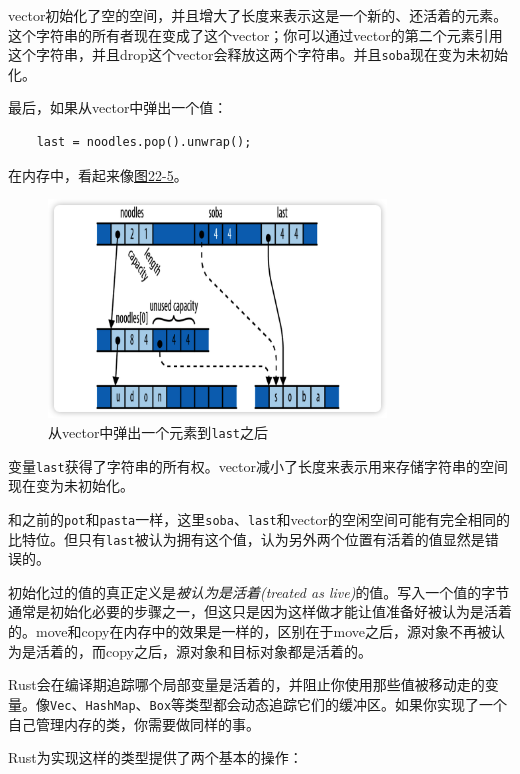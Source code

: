 vector初始化了空的空间，并且增大了长度来表示这是一个新的、还活着的元素。这个字符串的所有者现在变成了这个vector；你可以通过vector的第二个元素引用这个字符串，并且drop这个vector会释放这两个字符串。并且\texttt{soba}现在变为未初始化。

最后，如果从vector中弹出一个值：
\begin{verbatim}
    last = noodles.pop().unwrap();
\end{verbatim}

在内存中，看起来像\hyperref[f22-5]{图22-5}。
\begin{figure}[htbp]
    \centering
    \includegraphics[width=0.8\textwidth]{../img/f22-5.png}
    \caption{从vector中弹出一个元素到\texttt{last}之后}
    \label{f22-5}
\end{figure}

变量\texttt{last}获得了字符串的所有权。vector减小了长度来表示用来存储字符串的空间现在变为未初始化。

和之前的\texttt{pot}和\texttt{pasta}一样，这里\texttt{soba}、\texttt{last}和vector的空闲空间可能有完全相同的比特位。但只有\texttt{last}被认为拥有这个值，认为另外两个位置有活着的值显然是错误的。

初始化过的值的真正定义是\emph{被认为是活着(treated as live)}的值。写入一个值的字节通常是初始化必要的步骤之一，但这只是因为这样做才能让值准备好被认为是活着的。move和copy在内存中的效果是一样的，区别在于move之后，源对象不再被认为是活着的，而copy之后，源对象和目标对象都是活着的。

Rust会在编译期追踪哪个局部变量是活着的，并阻止你使用那些值被移动走的变量。像\texttt{Vec}、\texttt{HashMap}、\texttt{Box}等类型都会动态追踪它们的缓冲区。如果你实现了一个自己管理内存的类，你需要做同样的事。

Rust为实现这样的类型提供了两个基本的操作：


